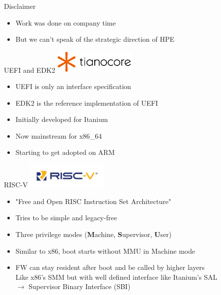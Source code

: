 \documentclass[
  10pt
]{beamer}
\begin{document}
\begin{frame}{Disclaimer}
  \begin{itemize}
    \item Work was done on company time
    \item But we can't speak of the strategic direction of HPE
  \end{itemize}
\end{frame}

\begin{frame}{UEFI and EDK2}
  \centering
  \includegraphics[width=0.3\textwidth]{resources/tianocore-logo.png}

  \vfill

  \begin{itemize}
    \item UEFI is only an interface specification
    \item EDK2 is the reference implementation of UEFI
    \item Initially developed for Itanium 
    \item Now mainstream for x86\_64
    \item Starting to get adopted on ARM %
  \end{itemize}
\end{frame}

\begin{frame}{RISC-V}
  \centering
  \includegraphics[width=0.3\textwidth]{resources/riscv-logo.png}

  \vfill

  \begin{itemize}
    \item "Free and Open RISC Instruction Set Architecture"
    \item Tries to be simple and legacy-free
    \item Three privilege modes (\textbf{M}achine, \textbf{S}upervisor, \textbf{U}ser)
    \item Similar to x86, boot starts without MMU in Machine mode
    \item FW can stay resident after boot and be called by higher layers \\
          Like x86's SMM but with well defined interface like Itanium's SAL \\
          $\rightarrow$ Supervisor Binary Interface (SBI)
  \end{itemize}
\end{frame}
\end{document}
